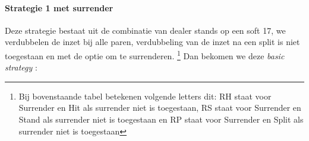 \documentclass[conference]{IEEEtran}
\begin{document}
\paragraph{Strategie 1 met surrender}

Deze strategie bestaat uit de combinatie van dealer stands op een soft 17, we verdubbelen de inzet bij alle paren, verdubbeling van de inzet na een split is niet toegestaan en met de optie om te surrenderen. \footnote{ Bij bovenstaande tabel betekenen volgende letters dit: RH staat voor Surrender en Hit als surrender niet is toegestaan, RS staat voor Surrender en Stand als surrender niet is toegestaan en RP staat voor Surrender en Split als surrender niet is toegestaan}
Dan bekomen we deze \textit{basic strategy} :
\end{document}
